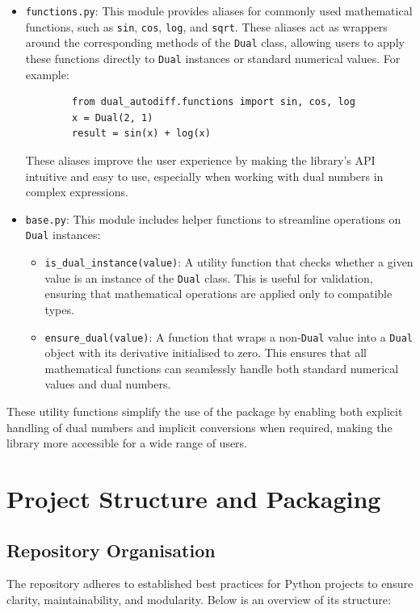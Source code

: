 \documentclass[a4paper,12pt]{article}
\begin{document}
    \begin{itemize}
        \item \texttt{functions.py}: This module provides aliases for commonly used mathematical functions, such as \texttt{sin}, \texttt{cos}, \texttt{log}, and \texttt{sqrt}. These aliases act as wrappers around the corresponding methods of the \texttt{Dual} class, allowing users to apply these functions directly to \texttt{Dual} instances or standard numerical values. For example:
        \begin{verbatim}
        from dual_autodiff.functions import sin, cos, log
        x = Dual(2, 1)
        result = sin(x) + log(x)
        \end{verbatim}
        These aliases improve the user experience by making the library's API intuitive and easy to use, especially when working with dual numbers in complex expressions.
    
        \item \texttt{base.py}: This module includes helper functions to streamline operations on \texttt{Dual} instances:
        \begin{itemize}
            \item \texttt{is\_dual\_instance(value)}: A utility function that checks whether a given value is an instance of the \texttt{Dual} class. This is useful for validation, ensuring that mathematical operations are applied only to compatible types.
            \item \texttt{ensure\_dual(value)}: A function that wraps a non-\texttt{Dual} value into a \texttt{Dual} object with its derivative initialised to zero. This ensures that all mathematical functions can seamlessly handle both standard numerical values and dual numbers.
        \end{itemize}
    \end{itemize}
    
    These utility functions simplify the use of the package by enabling both explicit handling of dual numbers and implicit conversions when required, making the library more accessible for a wide range of users.
    

\section{Project Structure and Packaging}

\subsection{Repository Organisation}
The repository adheres to established best practices for Python projects to ensure clarity, maintainability, and modularity. Below is an overview of its structure:
\end{document}
